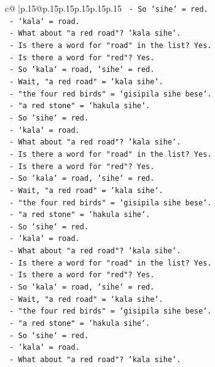 \documentclass{article}
\begin{document}
{\begin{supertabular}{c@{$\;$}|p{.15\linewidth}@{}p{.15\linewidth}p{.15\linewidth}p{.15\linewidth}p{.15\linewidth}p{.15\linewidth}}
{{{\texttt{  {-} So `sihe` = red.} \\
\texttt{  {-} `kala` = road.} \\
\texttt{  {-} What about "a red road"? `kala sihe`.} \\
\texttt{  {-} Is there a word for "road" in the list? Yes.} \\
\texttt{  {-} Is there a word for "red"? Yes.} \\
\texttt{  {-} So `kala` = road, `sihe` = red.} \\
\texttt{  {-} Wait, "a red road" = `kala sihe`.} \\
\texttt{  {-} "the four red birds" = `gisipila sihe bese`.} \\
\texttt{  {-} "a red stone" = `hakula sihe`.} \\
\texttt{  {-} So `sihe` = red.} \\
\texttt{  {-} `kala` = road.} \\
\texttt{  {-} What about "a red road"? `kala sihe`.} \\
\texttt{  {-} Is there a word for "road" in the list? Yes.} \\
\texttt{  {-} Is there a word for "red"? Yes.} \\
\texttt{  {-} So `kala` = road, `sihe` = red.} \\
\texttt{  {-} Wait, "a red road" = `kala sihe`.} \\
\texttt{  {-} "the four red birds" = `gisipila sihe bese`.} \\
\texttt{  {-} "a red stone" = `hakula sihe`.} \\
\texttt{  {-} So `sihe` = red.} \\
\texttt{  {-} `kala` = road.} \\
\texttt{  {-} What about "a red road"? `kala sihe`.} \\
\texttt{  {-} Is there a word for "road" in the list? Yes.} \\
\texttt{  {-} Is there a word for "red"? Yes.} \\
\texttt{  {-} So `kala` = road, `sihe` = red.} \\
\texttt{  {-} Wait, "a red road" = `kala sihe`.} \\
\texttt{  {-} "the four red birds" = `gisipila sihe bese`.} \\
\texttt{  {-} "a red stone" = `hakula sihe`.} \\
\texttt{  {-} So `sihe` = red.} \\
\texttt{  {-} `kala` = road.} \\
\texttt{  {-} What about "a red road"? `kala sihe`.} \\
}}}
\end{supertabular}}
\end{document}

